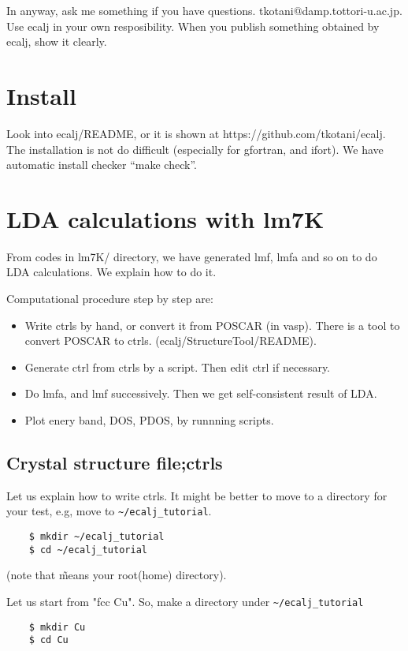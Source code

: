 \documentclass[a4paper,10pt,epsf,fleqn]{article}
\begin{document}
In anyway, ask me something if you have questions. 
tkotani@damp.tottori-u.ac.jp. Use ecalj in your own resposibility.
When you publish something obtained by ecalj, show it clearly.


\section{Install}
\label{install}
Look into ecalj/README, or it is shown at https://github.com/tkotani/ecalj.
The installation is not do difficult (especially for gfortran, and
ifort). We have automatic install checker ``make check''.


\section{LDA calculations with lm7K}
From codes in lm7K/ directory, we have generated lmf, lmfa and so on
to do LDA calculations. We explain how to do it.

Computational procedure step by step are:
\begin{itemize}
\item Write ctrls by hand, or convert it from POSCAR (in vasp). There
  is a tool to convert POSCAR to ctrls. (ecalj/StructureTool/README).
\item Generate ctrl from ctrls by a script. Then edit ctrl if necessary.
\item Do lmfa, and lmf successively. Then we get self-consistent result of LDA.
\item Plot enery band, DOS, PDOS, by runnning scripts.
\end{itemize}

\subsection{Crystal structure file;ctrls}
\label{ctrls}
Let us explain how to write ctrls.
It might be better to move to a directory for your test, 
e.g, move to \verb+~/ecalj_tutorial+.
\begin{verbatim}
    $ mkdir ~/ecalj_tutorial
    $ cd ~/ecalj_tutorial
\end{verbatim}
(note that \~ means your root(home) directory).

Let us start from "fcc Cu". So, make a directory under \verb+~/ecalj_tutorial+
\begin{verbatim}
    $ mkdir Cu
    $ cd Cu
\end{verbatim}
\end{document}
